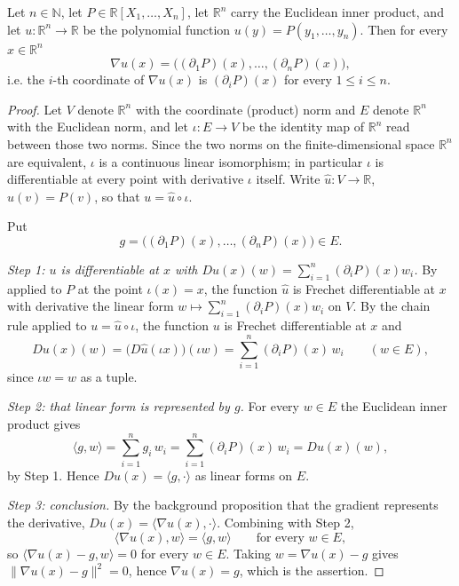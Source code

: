 \begin{lemma}
Let $n\in\mathbb{N}$, let $P\in\mathbb{R}[X_1,\dots,X_n]$, let $\mathbb{R}^n$
carry the Euclidean inner product, and let $u:\mathbb{R}^n\to\mathbb{R}$ be the
polynomial function $u(y)=P(y_1,\dots,y_n)$. Then for every
$x\in\mathbb{R}^n$
\[
  \nabla u(x)=\bigl((\partial_1P)(x),\dots,(\partial_nP)(x)\bigr),
\]
i.e. the $i$-th coordinate of $\nabla u(x)$ is $(\partial_iP)(x)$ for every
$1\le i\le n$.
\end{lemma}
\begin{proof}
Let $V$ denote $\mathbb{R}^n$ with the coordinate (product) norm and $E$ denote
$\mathbb{R}^n$ with the Euclidean norm, and let $\iota:E\to V$ be the identity
map of $\mathbb{R}^n$ read between those two norms. Since the two norms on the
finite-dimensional space $\mathbb{R}^n$ are equivalent, $\iota$ is a continuous
linear isomorphism; in particular $\iota$ is differentiable at every point with
derivative $\iota$ itself. Write $\widehat{u}:V\to\mathbb{R}$,
$\widehat{u}(v)=P(v)$, so that $u=\widehat{u}\circ\iota$.

Put
\[
  g=\bigl((\partial_1P)(x),\dots,(\partial_nP)(x)\bigr)\in E .
\]

\emph{Step 1: $u$ is differentiable at $x$ with $Du(x)(w)=\sum_{i=1}^n(\partial_iP)(x)w_i$.}
By  applied to $P$ at the point $\iota(x)=x$, the function
$\widehat{u}$ is Frechet differentiable at $x$ with derivative the linear form
$w\mapsto\sum_{i=1}^{n}(\partial_iP)(x)w_i$ on $V$. By the chain rule applied to
$u=\widehat{u}\circ\iota$, the function $u$ is Frechet differentiable at $x$ and
\[
  Du(x)(w)=\bigl(D\widehat{u}(\iota x)\bigr)(\iota w)
  =\sum_{i=1}^{n}(\partial_iP)(x)\,w_i
  \qquad(w\in E),
\]
since $\iota w=w$ as a tuple.

\emph{Step 2: that linear form is represented by $g$.} For every $w\in E$ the
Euclidean inner product gives
\[
  \langle g,w\rangle=\sum_{i=1}^{n}g_i\,w_i=\sum_{i=1}^{n}(\partial_iP)(x)\,w_i
  =Du(x)(w),
\]
by Step 1. Hence $Du(x)=\langle g,\cdot\rangle$ as linear forms on $E$.

\emph{Step 3: conclusion.} By the background proposition that the gradient
represents the derivative, $Du(x)=\langle\nabla u(x),\cdot\rangle$. Combining
with Step 2,
\[
  \langle\nabla u(x),w\rangle=\langle g,w\rangle\qquad\text{for every }w\in E,
\]
so $\langle\nabla u(x)-g,w\rangle=0$ for every $w\in E$. Taking
$w=\nabla u(x)-g$ gives $\lVert\nabla u(x)-g\rVert^2=0$, hence
$\nabla u(x)=g$, which is the assertion.
\end{proof}
